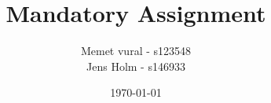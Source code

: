 

\title{Mandatory Assignment}
\date{\today}
\author{Memet vural - s123548\\ Jens Holm - s146933}



\maketitle

\tableofcontents

\clearpage














